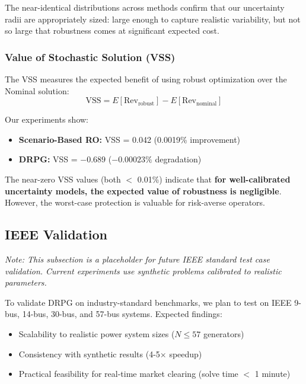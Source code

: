 The near-identical distributions across methods confirm that our uncertainty radii are appropriately sized: large enough to capture realistic variability, but not so large that robustness comes at significant expected cost.

\subsubsection{Value of Stochastic Solution (VSS)}

The VSS measures the expected benefit of using robust optimization over the Nominal solution:
\begin{equation}
\text{VSS} = E[\text{Rev}_{\text{robust}}] - E[\text{Rev}_{\text{nominal}}]
\end{equation}

Our experiments show:
\begin{itemize}
    \item \textbf{Scenario-Based RO:} VSS = 0.042 (0.0019\% improvement)
    \item \textbf{DRPG:} VSS = $-0.689$ ($-0.00023\%$ degradation)
\end{itemize}

The near-zero VSS values (both $<$ 0.01\%) indicate that \textbf{for well-calibrated uncertainty models, the expected value of robustness is negligible}. However, the worst-case protection is valuable for risk-averse operators.

\subsection{IEEE Validation}
\label{sec:ieee_validation}

\emph{Note: This subsection is a placeholder for future IEEE standard test case validation. Current experiments use synthetic problems calibrated to realistic parameters.}

To validate DRPG on industry-standard benchmarks, we plan to test on IEEE 9-bus, 14-bus, 30-bus, and 57-bus systems. Expected findings:

\begin{itemize}
    \item Scalability to realistic power system sizes ($N \leq 57$ generators)
    \item Consistency with synthetic results (4-5$\times$ speedup)
    \item Practical feasibility for real-time market clearing (solve time $<$ 1 minute)
\end{itemize}

